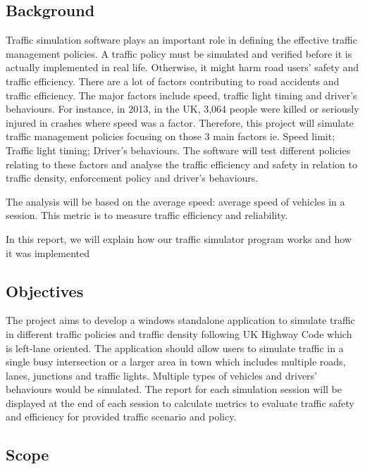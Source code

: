 \documentclass[11pt]{article}
\begin{document}
\subsection{Background}
Traffic simulation software plays an important role in defining the effective traffic management policies. A traffic policy must be simulated and verified before it is actually implemented in real life. Otherwise, it might harm road users’ safety and traffic efficiency. There are a lot of factors contributing to road accidents and traffic efficiency. The major factors include speed, traffic light timing and driver’s behaviours. For instance, in 2013, in the UK, 3,064 people were killed or seriously injured in crashes where speed was a factor.
Therefore, this project will simulate traffic management policies focusing on those 3 main factors ie. Speed limit; Traffic light timing; Driver's behaviours. The software will test different policies relating to these factors and analyse the traffic efficiency and safety in relation to traffic density, enforcement policy and driver's behaviours.

The analysis will be based on the average speed: average speed of vehicles in a session. This metric is to measure traffic efficiency and reliability.

In this report, we will explain how our traffic simulator program works and how it was implemented
	


\subsection{Objectives}
The project aims to develop a windows standalone application to simulate traffic in different traffic policies and traffic density following UK Highway Code which is left-lane oriented. The application should allow users to simulate traffic in a single busy intersection or a larger area in town which includes multiple roads, lanes, junctions and traffic lights. Multiple types of vehicles and drivers' behaviours would be simulated. The report for each simulation session will be displayed at the end of each session to calculate metrics to evaluate traffic safety and efficiency for provided traffic scenario and policy.




\subsection{Scope}
\end{document}
